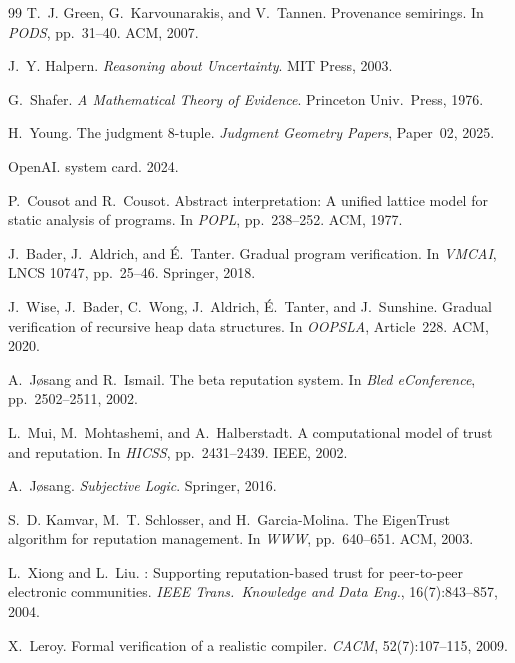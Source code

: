 \documentclass[11pt]{article}
\begin{document}
\begin{thebibliography}{99}
T.~J. Green, G.~Karvounarakis, and V.~Tannen.
\newblock Provenance semirings.
\newblock In \emph{PODS}, pp.~31--40. ACM, 2007.

J.~Y. Halpern.
\newblock \emph{Reasoning about Uncertainty}.
\newblock MIT Press, 2003.

G.~Shafer.
\newblock \emph{A Mathematical Theory of Evidence}.
\newblock Princeton Univ.\ Press, 1976.

H.~Young.
\newblock The judgment 8-tuple.
\newblock \emph{Judgment Geometry Papers}, Paper~02, 2025.

OpenAI.
 system card. 2024.

P.~Cousot and R.~Cousot.
\newblock Abstract interpretation: A unified lattice model for static analysis of programs.
\newblock In \emph{POPL}, pp.~238--252. ACM, 1977.

J.~Bader, J.~Aldrich, and \'E.~Tanter.
\newblock Gradual program verification.
\newblock In \emph{VMCAI}, LNCS 10747, pp.~25--46. Springer, 2018.

J.~Wise, J.~Bader, C.~Wong, J.~Aldrich, \'E.~Tanter, and J.~Sunshine.
\newblock Gradual verification of recursive heap data structures.
\newblock In \emph{OOPSLA}, Article~228. ACM, 2020.

A.~J\o{}sang and R.~Ismail.
\newblock The beta reputation system.
\newblock In \emph{Bled eConference}, pp.~2502--2511, 2002.

L.~Mui, M.~Mohtashemi, and A.~Halberstadt.
\newblock A computational model of trust and reputation.
\newblock In \emph{HICSS}, pp.~2431--2439. IEEE, 2002.

A.~J\o{}sang.
\newblock \emph{Subjective Logic}.
\newblock Springer, 2016.

S.~D. Kamvar, M.~T. Schlosser, and H.~Garcia-Molina.
\newblock The {EigenTrust} algorithm for reputation management.
\newblock In \emph{WWW}, pp.~640--651. ACM, 2003.

L.~Xiong and L.~Liu.
: Supporting reputation-based trust for peer-to-peer electronic communities.
\newblock \emph{IEEE Trans.\ Knowledge and Data Eng.}, 16(7):843--857, 2004.

X.~Leroy.
\newblock Formal verification of a realistic compiler.
\newblock \emph{CACM}, 52(7):107--115, 2009.

\end{thebibliography}
\end{document}
